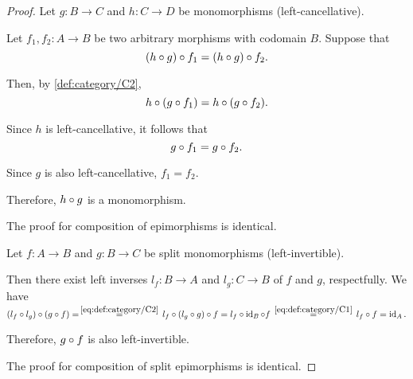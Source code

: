 \begin{proof}
   Let \( g: B \to C \) and \( h: C \to D \) be monomorphisms (left-cancellative).

  Let \( f_1, f_2: A \to B \) be two arbitrary morphisms with codomain \( B \). Suppose that
  \begin{equation*}
    (h \mathbin \circ g) \mathbin \circ f_1 = (h \mathbin \circ g) \mathbin \circ f_2.
  \end{equation*}

  Then, by \ref{def:category/C2},
  \begin{equation*}
    h \mathbin \circ (g \mathbin \circ f_1) = h \mathbin \circ (g \mathbin \circ f_2).
  \end{equation*}

  Since \( h \) is left-cancellative, it follows that
  \begin{equation*}
    g \mathbin \circ f_1 = g \mathbin \circ f_2.
  \end{equation*}

  Since \( g \) is also left-cancellative, \( f_1 = f_2 \).

  Therefore, \( h \mathbin \circ g \) is a monomorphism.

  The proof for composition of epimorphisms is identical.

   Let \( f: A \to B \) and \( g: B \to C \) be split monomorphisms (left-invertible).

  Then there exist left inverses \( l_f: B \to A \) and \( l_g: C \to B \) of \( f \) and \( g \), respectfully. We have
  \begin{equation*}
    (l_f \bincirc l_g) \bincirc (g \bincirc f)
    =
    \reloset {\eqref{eq:def:category/C2}} =
    l_f \bincirc (l_g \bincirc g) \bincirc f
    =
    l_f \bincirc \id_B \bincirc f
    \reloset {\eqref{eq:def:category/C1}} =
    l_f \bincirc f
    =
    \id_A.
  \end{equation*}

  Therefore, \( g \mathbin \circ f \) is also left-invertible.

  The proof for composition of split epimorphisms is identical.
\end{proof}

